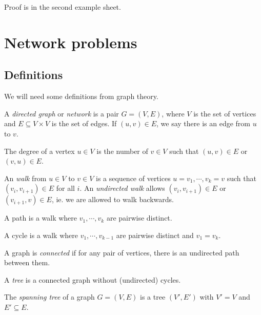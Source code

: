 \documentclass[a4paper]{article}
\begin{document}
Proof is in the second example sheet.

\section{Network problems}
\subsection{Definitions}
We will need some definitions from graph theory.
\begin{defi}
  A \emph{directed graph} or \emph{network} is a pair $G = (V, E)$, where $V$ is the set of vertices and $E\subseteq V\times V$ is the set of edges. If $(u, v)\in E$, we say there is an edge from $u$ to $v$.
\end{defi}

\begin{defi}[Degree]
  The degree of a vertex $u \in V$ is the number of $v\in V$ such that $(u, v)\in E$ or $(v, u)\in E$.
\end{defi}

\begin{defi}[Walk]
  An \emph{walk} from $u\in V$ to $v\in V$ is a sequence of vertices $u = v_1, \cdots, v_k = v$ such that $(v_i, v_{i + 1})\in E$ for all $i$. An \emph{undirected walk} allows $(v_i, v_{i + 1})\in E$ or $(v_{i + 1}, v)\in E$, ie. we are allowed to walk backwards.
\end{defi}

\begin{defi}[Path]
  A path is a walk where $v_1, \cdots, v_k$ are pairwise distinct.
\end{defi}

\begin{defi}[Cycle]
  A cycle is a walk where $v_1, \cdots, v_{k - 1}$ are pairwise distinct and $v_1 = v_k$.
\end{defi}

\begin{defi}
  A graph is \emph{connected} if for any pair of vertices, there is an undirected path between them.
\end{defi}

\begin{defi}[Tree]
  A \emph{tree} is a connected graph without (undirected) cycles.
\end{defi}

\begin{defi}
  The \emph{spanning tree} of a graph $G = (V, E)$ is a tree $(V', E')$ with $V' = V$ and $E'\subseteq E$.
\end{defi}
\end{document}
